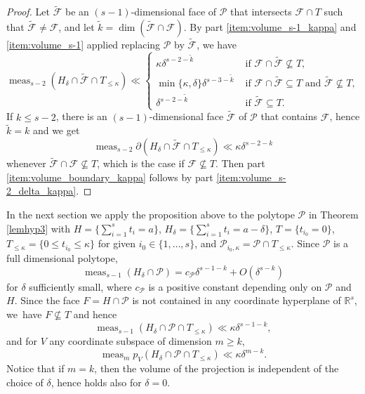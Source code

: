 \documentclass[11pt]{article}
\numberwithin{equation}{section}
\let\del\delta
\newcommand{\calP}{\mathcal{P}}
\newcommand\RR{\mathbb{R}}
\DeclareMathOperator{\meas}{meas}
\theoremstyle{definition}
\numberwithin{theorem}{section}
\begin{document}
\begin{proof}
Let $\widetilde{\mathcal F}$ be an $(s-1)$-dimensional face of $\mathcal P$ that intersects $\mathcal F\cap T$
such that $\widetilde{\mathcal F}\neq\mathcal F$, and let
$\tilde k=\dim(\widetilde{\mathcal F}\cap\mathcal F)$. By part \eqref{item:volume_s-1_kappa} and \eqref{item:volume_s-1} applied replacing
$\mathcal P$ by $\widetilde{\mathcal F}$, we have
\[
\meas_{s-2}(H_\delta\cap\widetilde{\mathcal F}\cap T_{\leq\kappa})
\ll \begin{cases}
\kappa\delta^{s-2-\tilde k} & \text{ if }\mathcal F\cap\widetilde{\mathcal F}\nsubseteq T,\\
\min\{\kappa,\delta\}\delta^{s-3-\tilde k} &\text{ if } \mathcal F\cap\widetilde{\mathcal F}\subseteq T \text{ and } \widetilde{\mathcal F}\nsubseteq T,\\
\delta^{s-2-\widetilde k} & \text{ if } \widetilde{\mathcal F}\subseteq T.
\end{cases}
\]
If $k\leq s-2$, there is an $(s-1)$-dimensional face $\widetilde{\mathcal F}$ of $\mathcal P$ that contains $\mathcal F$, hence $\tilde k=k$ and we get
\[
\meas_{s-2} \partial (H_{\del}\cap \widetilde{\mathcal F}\cap T_{\leq\kappa}) \ll \kappa \del^{s-2-k}
\]
whenever $\widetilde{\mathcal F}\cap\mathcal F\nsubseteq T$, which is the case if $\mathcal F\nsubseteq T$.
Then part \eqref{item:volume_boundary_kappa} follows by part \eqref{item:volume_s-2_delta_kappa}.
\end{proof}

In the next section we apply the proposition above to the polytope $\mathcal P$ in Theorem \ref{lemhyp3} with $H=\{\sum_{i=1}^s t_i=a\}$, $H_\delta=\{\sum_{i=1}^s t_i=a-\delta\}$, $T=\{t_{i_0}=0\}$, $T_{\leq\kappa}=\{0\leq t_{i_0}\leq\kappa\}$ for given $i_0\in\{1,\dots,s\}$, and $\mathcal P_{i_0,\kappa}=\mathcal P\cap T_{\leq\kappa}$. Since $\mathcal P$ is a full dimensional polytope,
\[
\meas_{s-1} (H_\delta \cap \mathcal P)=
c_\calP \delta^{s-1-k}+O(\delta^{s-k})
\]
for $\delta$ sufficiently small, where $c_\calP$ is a positive constant depending only on $\mathcal P$ and $H$.
Since the face $F=H\cap\mathcal P$ is not contained in any coordinate hyperplane of $\RR^s$, we~have $F\nsubseteq T$ and hence\vspace*{-3pt}
\[
\meas_{s-1} (H_\delta \cap \mathcal P \cap T_{\leq \kappa}) \ll
\kappa \delta^{s-1-k},
\]
and for $V$ any coordinate subspace of dimension $m\geq k$,\vspace*{-3pt}
\[
\meas_mp_V(H_\delta\cap\mathcal P\cap T_{\leq \kappa})\ll
\kappa \delta^{m-k}.
\]
Notice that if $m=k$, then the volume of the projection is independent of the choice of $\delta$, hence holds also for $\delta=0$.
\end{document}
